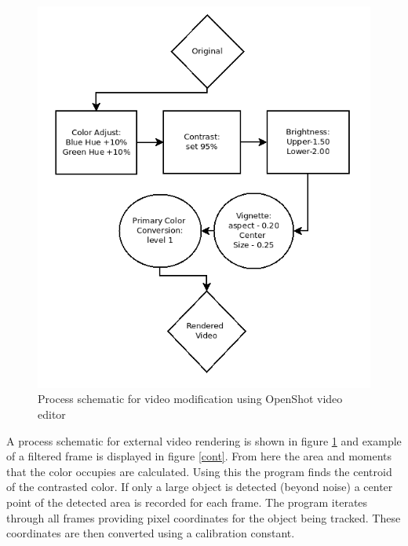 \documentclass[paper=a4, fontsize=11pt, abstract=on]{scrartcl}
\numberwithin{equation}{section}		%
\numberwithin{figure}{section}			%
\numberwithin{table}{section}				%
\begin{document}
\begin{figure}[H]
\centering
\includegraphics[width=0.6\linewidth]{rend}
\caption{Process schematic for video modification using OpenShot video editor}
\label{rend}
\end{figure}

A process schematic for external video rendering is shown in figure \ref{rend} and example of a filtered frame is displayed in figure \ref{cont}. From here the area and moments that the color occupies are calculated. Using this the program finds the centroid of the contrasted color. If only a large object is detected (beyond noise) a center point of the detected area is recorded for each frame. The program iterates through all frames providing pixel coordinates for the object being tracked. These coordinates are then converted using a calibration constant. 
\end{document}
